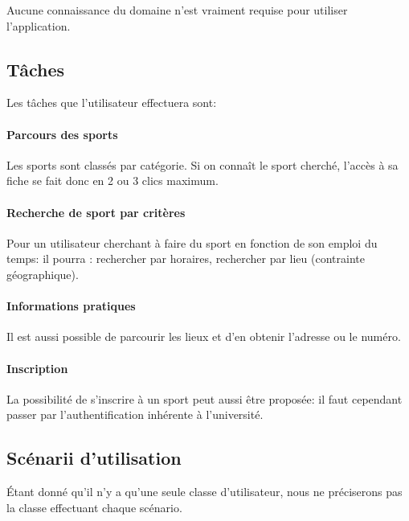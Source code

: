 \documentclass[french, titlepage, 11pt, a4paper]{article}
\begin{document}
		Aucune connaissance du domaine n'est vraiment requise pour utiliser
		l'application.

	\subsection{Tâches}

	 Les tâches que l'utilisateur effectuera sont:

	    \paragraph{Parcours des sports}

	        Les sports sont classés par catégorie. Si on connaît le sport
	        cherché, l'accès à sa fiche se fait donc en 2 ou 3 \og clics\fg{}
	        maximum.

        \paragraph{Recherche de sport par critères}

            Pour un utilisateur cherchant à faire du sport en fonction de son
            emploi du temps: il pourra : rechercher par horaires, rechercher par
            lieu (contrainte géographique).

        \paragraph{Informations pratiques}

            Il est aussi possible de parcourir les lieux et d'en obtenir
            l'adresse ou le numéro.

        \paragraph{Inscription}

            La possibilité de s'inscrire à un sport peut aussi être proposée: il
            faut cependant passer par l'authentification inhérente à
            l'université.


    \subsection{Scénarii d'utilisation}

    Étant donné qu'il n'y a qu'une seule classe d'utilisateur, nous ne
    préciserons pas la classe effectuant chaque scénario.
\end{document}
